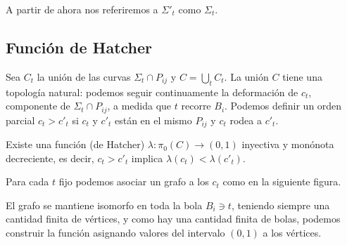 \documentclass[twoside, 11pt]{article}
\begin{document}
A partir de ahora nos referiremos a $\Sigma'_t$ como $\Sigma_t$. 

\subsection{Función de Hatcher}
Sea $C_t$ la unión de las curvas $\Sigma_t\cap P_{ij}$ y $C=\bigcup_t C_t$. La unión $C$ tiene una topología natural: podemos seguir continuamente la deformación de $c_t$, componente de $\Sigma_t\cap P_{ij}$, a medida que $t$ recorre $B_i$. Podemos definir un orden parcial $c_t>c'_t$ si $c_t$ y $c'_t$ están en el mismo $P_{ij}$ y $c_t$ rodea a $c'_t$. 

\begin{prop}
Existe una función (de Hatcher) $\lambda:\pi_0(C)\to (0,1)$ inyectiva y monónota decreciente, es decir, $c_t>c'_t$ implica $\lambda(c_t)<\lambda(c'_t)$.
\end{prop}
\begin{dem}
Para cada $t$ fijo podemos asociar un grafo a los $c_t$ como en la siguiente figura.


El grafo se mantiene isomorfo en toda la bola $B_i\ni t$, teniendo siempre una cantidad finita de vértices, y como hay una cantidad finita de bolas, podemos construir la función asignando valores del intervalo $(0,1)$ a los vértices.
\QED
\end{dem}
\end{document}
